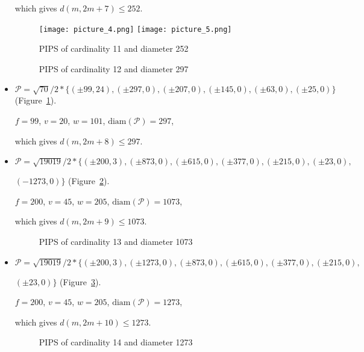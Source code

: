 \documentclass[12pt]{article}
\theoremstyle{theorem}
\theoremstyle{dfn}
\theoremstyle{remark}
\begin{document}
\begin{itemize}
which gives $d(m, 2m + 7) \leq 252$.


\begin{figure}[htbp]
	\texttt{[image: picture\_4.png]}
	\hfill
	\texttt{[image: picture\_5.png]}
	\\
	\parbox{.48\linewidth}{\caption{PIPS of cardinality 11 and diameter 252}
	\label{picture_4.png}}
	\hfill
	\parbox{.48\linewidth}{\caption{PIPS of cardinality 12 and diameter 297}
	\label{picture_5.png}}
\end{figure}


\item
$\mathcal{P}=\sqrt{70}/{2} * \{ (\pm 99, 24),
(\pm 297 , 0),
(\pm 207 , 0),
(\pm 145 , 0),
(\pm 63 , 0),
(\pm 25 , 0)\}
$
(Figure~\ref{picture_5.png}).

$f = 99$, $v = 20$, $w = 101$, $\operatorname{diam(\mathcal{P})} = 297$,

which gives $d(m, 2m + 8) \leq 297$.


\item
$\mathcal{P}=\sqrt{19019}/{2} * \{ (\pm 200, 3),
(\pm 873 , 0),
(\pm 615 , 0),
(\pm 377 , 0),
(\pm 215 , 0),
(\pm 23 , 0),
$

$
(-1273 , 0)\}
$
(Figure~\ref{picture_6.png}).

$f = 200$, $v = 45$, $w = 205$, $\operatorname{diam(\mathcal{P})} = 1073$,

which gives $d(m, 2m + 9) \leq 1073$.


\begin{figure}[h!]
\parbox{0.7\linewidth}{\caption{PIPS of cardinality 13 and diameter 1073}
\label{picture_6.png}}
\end{figure}


\item
$\mathcal{P}=\sqrt{19019}/{2} * \{ (\pm 200, 3),
(\pm 1273 , 0),
(\pm 873 , 0),
(\pm 615 , 0),
(\pm 377 , 0),
(\pm 215 , 0),
$

$
(\pm 23 , 0)\}
$
(Figure~\ref{picture_7.png}).

$f = 200$, $v = 45$, $w = 205$, $\operatorname{diam(\mathcal{P})} = 1273$,

which gives $d(m, 2m + 10) \leq 1273$.


\begin{figure}[h!]
\parbox{0.7\linewidth}{\caption{PIPS of cardinality 14 and diameter 1273}
\label{picture_7.png}}
\end{figure}



\end{itemize}
\end{document}
